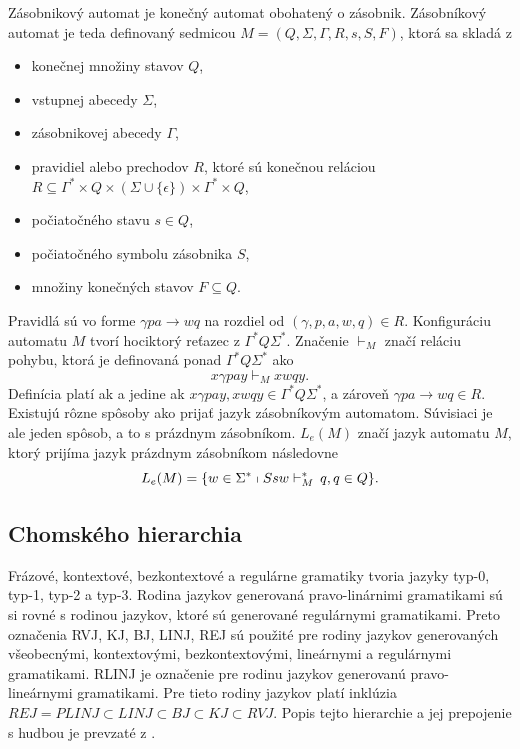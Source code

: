 \begin{definition}
\label{def:zasaut}
Zásobnikový automat je konečný automat obohatený o zásobnik. Zásobníkový automat je teda definovaný sedmicou $M = (Q,\Sigma, \Gamma , R,s,S,F)$, ktorá sa skladá z
\begin{itemize}\itemsep0.05em
    \item konečnej množiny stavov $Q$,
    \item vstupnej abecedy $\Sigma$,
    \item zásobnikovej abecedy $\Gamma$,
    \item pravidiel alebo prechodov $R$, ktoré sú konečnou reláciou $R \subseteq \Gamma^* \times Q \times (\Sigma \cup \{\epsilon\}) \times \Gamma^* \times Q$,
    \item počiatočného stavu $s \in Q$,
    \item počiatočného symbolu zásobnika $S$,
    \item množiny konečných stavov $F \subseteq Q$.
\end{itemize}
Pravidlá sú vo forme $\gamma pa \rightarrow wq$ na rozdiel od $(\gamma , p, a, w, q) \in R$. Konfiguráciu automatu $M$ tvorí hociktorý reťazec z $\Gamma^* Q\Sigma^*$. Značenie $\vdash_M$ značí reláciu pohybu, ktorá je definovaná ponad $\Gamma^* Q\Sigma^*$ ako $$x\gamma pay \vdash_M xwqy.$$ Definícia platí ak a jedine ak $x\gamma pay, xwqy \in \Gamma^* Q\Sigma^*$, a zároveň $\gamma pa \rightarrow wq \in R$. Existujú rôzne spôsoby ako prijať jazyk zásobníkovým automatom. Súvisiaci je ale jeden spôsob, a to s prázdnym zásobníkom. $L_e(M)$ značí jazyk automatu $M$, ktorý prijíma jazyk prázdnym zásobníkom následovne $$L_e(M) = \{w \in \Sigma^* \shortmid Ssw \vdash_M^* \,q,q \in Q\}.$$
\end{definition}

\subsection{Chomského hierarchia}
Frázové, kontextové, bezkontextové a regulárne gramatiky tvoria jazyky typ-0, typ-1, typ-2 a typ-3. Rodina jazykov generovaná pravo-linárnimi gramatikami sú si rovné s rodinou jazykov, ktoré sú generované regulárnymi gramatikami. Preto označenia RVJ, KJ, BJ, LINJ, REJ sú použité pre rodiny jazykov generovaných všeobecnými, kontextovými, bezkontextovými, lineárnymi a regulárnymi gramatikami. RLINJ je označenie pre rodinu jazykov generovanú pravo-lineárnymi gramatikami. Pre tieto rodiny jazykov platí inklúzia $REJ = PLINJ \subset LINJ \subset BJ \subset KJ \subset RVJ$. Popis tejto hierarchie a jej prepojenie s hudbou je prevzaté z \cite{jstorgrammusic, musicformallang}.

